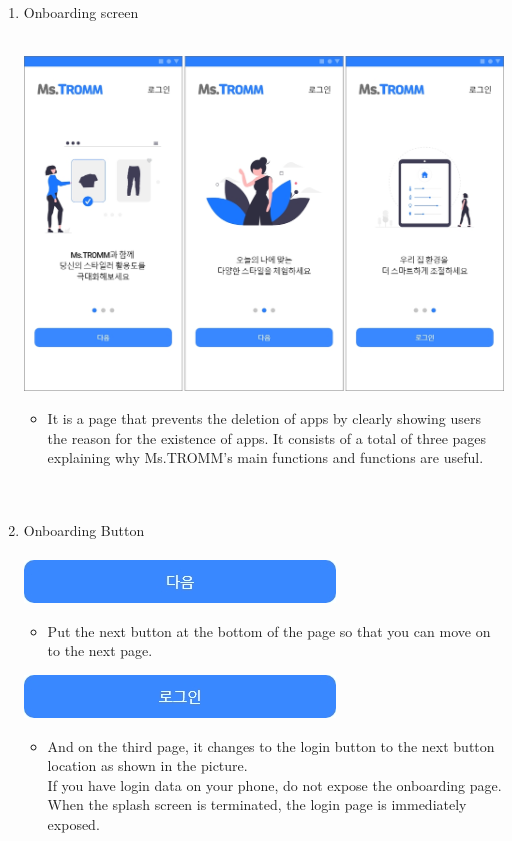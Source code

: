 \documentclass[conference]{IEEEtran}
\begin{document}
\begin{enumerate}
    \break
    
    \item Onboarding screen \\ \\
    \centerline{\includegraphics[scale=0.25]{assets/온보딩.png}}
    \begin{itemize}
    \item[] It is a page that prevents the deletion of apps by clearly showing users the reason for the existence of apps. It consists of a total of three pages explaining why Ms.TROMM's main functions and functions are useful.\\ \\ \\
    \end{itemize}
    \item Onboarding Button \\ \\
    {\includegraphics[scale=0.75]{assets/온보딩_다음.jpg}}
    \begin{itemize}
    \item[] Put the next button at the bottom of the page so that you can move on to the next page.
    \end{itemize}
    {\includegraphics[scale=0.75]{assets/온보딩_로그인.jpg}}
    \begin{itemize}
    \item[] And on the third page, it changes to the login button to the next button location as shown in the picture. 
    \\ If you have login data on your phone, do not expose the onboarding page. When the splash screen is terminated, the login page is immediately exposed.
    \end{itemize}
    \end{enumerate}
    \break
\end{document}
